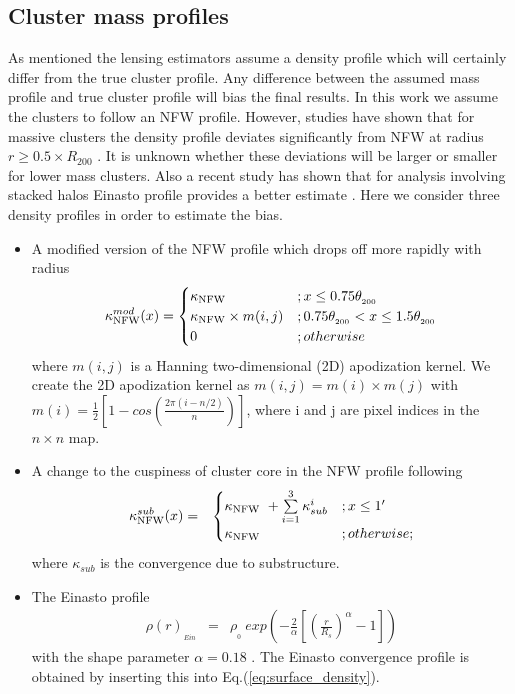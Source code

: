 \subsection{Cluster mass profiles}
\label{sec_den_profiles}
As mentioned the lensing estimators assume a density profile which will certainly differ from the true cluster profile. 
Any difference between the assumed mass profile and true cluster profile will bias the final results.
In this work we assume the clusters to follow an NFW profile. 
However, studies have shown that for massive clusters the density profile deviates significantly from NFW at radius $r \ge 0.5 \times R_{200}$ \citep{diemer14}. 
It is unknown whether these deviations will be larger or smaller for lower mass clusters.
Also a recent study has shown that for analysis involving stacked halos Einasto profile \citep{einasto89} provides a better estimate \citep{child18}.
Here we consider three density profiles in order to estimate the bias.
\begin{itemize}
\item A modified version of the NFW profile which drops off more rapidly with radius
\begin{eqnarray}
\kappa_{\rm NFW}^{mod}(x) =
\begin{cases}
    \kappa_{\rm NFW} &; x \le 0.75\theta_{_{200}}\\
    \kappa_{\rm NFW} \times m(i,j)&; 0.75\theta_{_{200}} < x \le 1.5\theta_{_{200}}\\
    0 &; otherwise
\label{eq_kappa_mod}
\end{cases}
\end{eqnarray}
where $m(i,j)$ is a Hanning two-dimensional (2D) apodization kernel.
We create the 2D apodization kernel as $m(i,j) = m(i) \times m(j)$ with $m(i) = \frac{1}{2} \left[ 1 - cos\left(\frac{2\pi  (i-n/2) }{n} \right)\right]$, where i and j are pixel indices in the $n \times n$ map.
\item A change to the cuspiness of cluster core in the NFW profile following \citet{king01} 
\begin{eqnarray}
\kappa_{\rm NFW}^{sub}(x)  & =  &
\begin{cases}
    \kappa_{\rm NFW}\ + \sum\limits_{i=1}^{3} \kappa_{sub}^{i}&; x \le 1'\\
    \kappa_{\rm NFW} &; otherwise;
\label{eq_kappa_sub}
\end{cases}
\end{eqnarray}
where $\kappa_{sub}$ is the convergence due to substructure.
\item The Einasto profile \citep{einasto89}
\begin{eqnarray}
\rho(r)_{_{Ein}} & = &  \rho_{_{0}}\ exp\left( - \frac{2}{\alpha} \left[\left(\frac{r}{R_s} \right)^{\alpha} - 1\right]\right)
\label{eq_einasto_density}
\end{eqnarray}
with the shape parameter $\alpha = 0.18$ \citep{ludlow13}. The Einasto convergence profile is obtained by inserting this into Eq.(\ref{eq:surface_density}).
\end{itemize}
 
